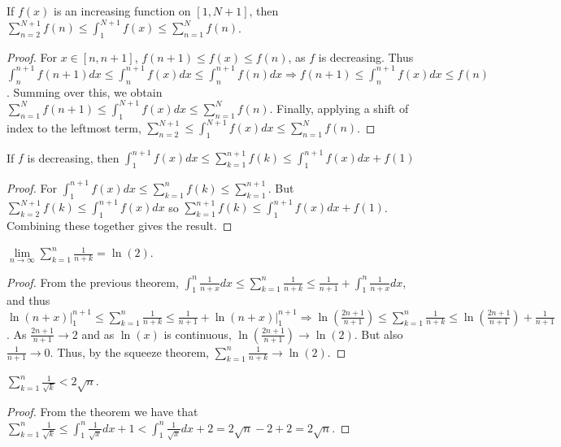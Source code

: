         \begin{theorem}
        If $f(x)$ is an increasing function on $[1,N+1]$, then $\sum_{n=2}^{N+1} f(n) \leq \int_{1}^{N+1} f(x) \leq \sum_{n=1}^{N} f(n)$.
        \end{theorem}
        \begin{proof}
        For $x\in [n,n+1]$, $f(n+1)\leq f(x)\leq f(n)$, as $f$ is decreasing. Thus $\int_{n}^{n+1} f(n+1)dx \leq \int_{n}^{n+1} f(x) dx \leq \int_{n}^{n+1} f(n)dx \Rightarrow f(n+1) \leq \int_{n}^{n+1}f(x)dx \leq f(n)$. Summing over this, we obtain $\sum_{n=1}^{N} f(n+1) \leq \int_{1}^{N+1} f(x) dx \leq \sum_{n=1}^{N} f(n)$. Finally, applying a shift of index to the leftmost term, $\sum_{n=2}^{N+1} \leq \int_{1}^{N+1}f(x)dx \leq \sum_{n=1}^{N} f(n)$. 
        \end{proof}
        \begin{theorem}
        If $f$ is decreasing, then $\int_{1}^{n+1} f(x)dx \leq \sum_{k=1}^{n+1} f(k) \leq \int_{1}^{n+1} f(x)dx + f(1)$
        \end{theorem}
        \begin{proof}
        For $\int_{1}^{n+1}f(x) dx \leq \sum_{k=1}^{n}f(k)\leq \sum_{k=1}^{n+1}$. But $\sum_{k=2}^{N+1} f(k) \leq \int_{1}^{n+1}f(x)dx$ so $\sum_{k=1}^{n+1}f(k) \leq \int_{1}^{n+1}f(x)dx +f(1)$. Combining these together gives the result.
        \end{proof}
        \begin{theorem}
        $\underset{n\rightarrow \infty}\lim \sum_{k=1}^{n} \frac{1}{n+k} = \ln(2)$.
        \end{theorem}
        \begin{proof}
        From the previous theorem, $\int_{1}^{n} \frac{1}{n+x} dx \leq \sum_{k=1}^{n} \frac{1}{n+k} \leq \frac{1}{n+1} + \int_{1}^{n} \frac{1}{n+x}dx$, and thus $\ln(n+x)\big|_{1}^{n+1} \leq \sum_{k=1}^{n} \frac{1}{n+k}\leq \frac{1}{n+1}+\ln(n+x)\big|_{1}^{n+1}\Rightarrow \ln(\frac{2n+1}{n+1})\leq \sum_{k=1}^{n} \frac{1}{n+k} \leq \ln(\frac{2n+1}{n+1})+\frac{1}{n+1}$. As $\frac{2n+1}{n+1}\rightarrow 2$ and as $\ln(x)$ is continuous, $\ln(\frac{2n+1}{n+1})\rightarrow \ln(2)$. But also $\frac{1}{n+1}\rightarrow 0$. Thus, by the squeeze theorem, $\sum_{k=1}^{n} \frac{1}{n+k} \rightarrow \ln(2)$.
        \end{proof}
        \begin{theorem}
        $\sum_{k=1}^{n}\frac{1}{\sqrt{k}}< 2\sqrt{n}$.
        \end{theorem}
        \begin{proof}
        From the theorem we have that $\sum_{k=1}^{n} \frac{1}{\sqrt{k}} \leq \int_{1}^{n}\frac{1}{\sqrt{x}}dx + 1 < \int_{1}^{n} \frac{1}{\sqrt{x}}dx +2 = 2\sqrt{n}-2+2 = 2\sqrt{n}$.
        \end{proof}
